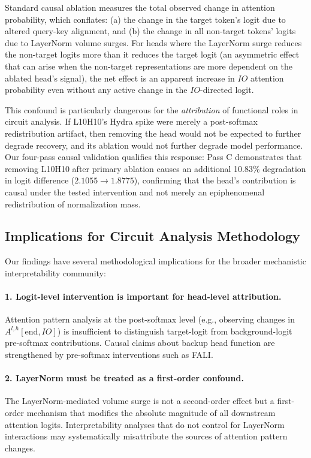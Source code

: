 \documentclass[12pt,a4paper]{article}
\begin{document}
Standard causal ablation measures the total observed change in attention
probability, which conflates: (a) the change in the target token's logit due to
altered query-key alignment, and (b) the change in all non-target tokens' logits
due to LayerNorm volume surges. For heads where the LayerNorm surge reduces
the non-target logits more than it reduces the target logit (an asymmetric
effect that can arise when the non-target representations are more dependent on
the ablated head's signal), the net effect is an apparent increase in $IO$
attention probability even without any active change in the $IO$-directed logit.

This confound is particularly dangerous for the \emph{attribution} of functional
roles in circuit analysis. If L10H10's Hydra spike were merely a post-softmax redistribution artifact, then removing the head would not be expected to further degrade recovery, and its ablation would not further degrade model performance. Our
four-pass causal validation qualifies this response: Pass C
demonstrates that removing L10H10 after primary ablation causes an additional
10.83\% degradation in logit difference ($2.1055 \to 1.8775$), confirming that
the head's contribution is causal under the tested intervention and not merely an
epiphenomenal redistribution of normalization mass.

\subsection{Implications for Circuit Analysis Methodology}

Our findings have several methodological implications for the broader
mechanistic interpretability community:

\paragraph{1. Logit-level intervention is important for head-level attribution.}
Attention pattern analysis at the post-softmax level (e.g., observing changes
in $A^{l,h}[\text{end}, IO]$) is insufficient to distinguish target-logit from
background-logit pre-softmax contributions. Causal claims about backup head function are strengthened by pre-softmax interventions such as FALI.

\paragraph{2. LayerNorm must be treated as a first-order confound.}
The LayerNorm-mediated volume surge is not a second-order effect but a first-order
mechanism that modifies the absolute magnitude of all downstream attention logits.
Interpretability analyses that do not control for LayerNorm interactions
may systematically misattribute the sources of attention pattern changes.
\end{document}
